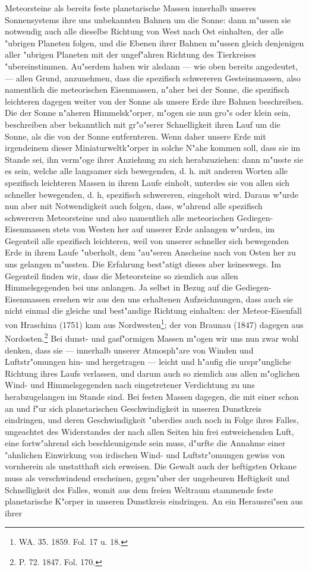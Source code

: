 \documentclass[a4paper, 8pt, oneside, polutonikogreek, german]{article}
\begin{document}
Meteorsteine als bereits feste planetarische Massen innerhalb unseres Sonnensystems ihre uns unbekannten Bahnen um die Sonne: dann m"ussen sie notwendig auch alle dieselbe Richtung von West nach Ost einhalten, der alle "ubrigen Planeten folgen, und die Ebenen ihrer Bahnen m"ussen gleich denjenigen aller "ubrigen Planeten mit der ungef"ahren Richtung des Tierkreises "ubereinstimmen. Au"serdem haben wir alsdann --- wie oben bereits angedeutet, --- allen Grund, anzunehmen, dass die spezifisch schwereren Gesteinsmassen, also namentlich die meteorischen Eisenmassen, n"aher bei der Sonne, die spezifisch leichteren dagegen weiter von der Sonne als unsere Erde ihre Bahnen beschreiben. Die der Sonne n"aheren Himmelsk"orper, m"ogen sie nun gro"s oder klein sein, beschreiben aber bekanntlich mit gr"o"serer Schnelligkeit ihren Lauf um die Sonne, als die von der Sonne entfernteren. Wenn daher unsere Erde mit irgendeinem dieser Miniaturweltk"orper in solche N"ahe kommen soll, dass sie im Stande sei, ihn verm"oge ihrer Anziehung zu sich herabzuziehen: dann m"usste sie es sein, welche alle langsamer sich bewegenden, d. h. mit anderen Worten alle spezifisch leichteren Massen in ihrem Laufe einholt, unterdes sie von allen sich schneller bewegenden, d. h, spezifisch schwereren, eingeholt wird. Daraus w"urde nun aber mit Notwendigkeit auch folgen, dass, w"ahrend alle spezifisch schwereren Meteorsteine und also namentlich alle meteorischen Gediegen-Eisenmassen stets von Westen her auf unserer Erde anlangen w"urden, im Gegenteil alle spezifisch leichteren, weil von unserer schneller sich bewegenden Erde in ihrem Laufe "uberholt, dem "au"seren Anscheine nach von Osten her zu uns gelangen m"ussten. Die Erfahrung best"atigt dieses aber keineswegs. Im Gegenteil finden wir, dass die Meteorsteine so ziemlich aus allen Himmelsgegenden bei uns anlangen. Ja selbst in Bezug auf die Gediegen-Eisenmassen ersehen wir aus den uns erhaltenen Aufzeichnungen, dass auch sie nicht einmal die gleiche und best"andige Richtung einhalten: der Meteor-Eisenfall von Hraschina (1751) kam aus Nordwesten\footnote{WA. 35. 1859. Fol. 17 u. 18.}; der von Braunau (1847) dagegen aus Nordosten.\footnote{P. 72. 1847. Fol. 170.} Bei dunst- und gasf"ormigen Massen m"ogen wir uns nun zwar wohl denken, dass sie --- innerhalb unserer Atmosph"are von Winden und Luftstr"omungen hin- und hergetragen --- leicht und h"aufig die urspr"ungliche Richtung ihres Laufs verlassen, und darum auch so ziemlich aus allen m"oglichen Wind- und Himmelsgegenden nach eingetretener Verdichtung zu uns herabzugelangen im Stande sind. Bei festen Massen dagegen, die mit einer schon an und f"ur sich planetarischen Geschwindigkeit in unseren Dunstkreis eindringen, und deren Geschwindigkeit "uberdies auch noch in Folge ihres Falles, ungeachtet des Widerstandes der nach allen Seiten hin frei entweichenden Luft, eine fortw"ahrend sich beschleunigende sein muss, d"urfte die Annahme einer "ahnlichen Einwirkung von irdischen Wind- und Luftstr"omungen gewiss von vornherein als unstatthaft sich erweisen. Die Gewalt auch der heftigsten Orkane muss als verschwindend erscheinen, gegen"uber der ungeheuren Heftigkeit und Schnelligkeit des Falles, womit aus dem freien Weltraum stammende feste planetarische K"orper in unseren Dunstkreis eindringen. An ein Herausrei"sen aus ihrer 
\end{document}
